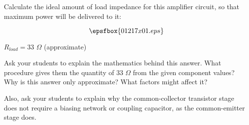 

Calculate the ideal amount of load impedance for this amplifier circuit, so that maximum power will be delivered to it:

$$\epsfbox{01217x01.eps}$$







$R_{load} = 33$ $\Omega$ (approximate)







Ask your students to explain the mathematics behind this answer.  What procedure gives them the quantity of 33 $\Omega$ from the given component values?  Why is this answer only approximate?  What factors might affect it?

Also, ask your students to explain why the common-collector transistor stage does not require a biasing network or coupling capacitor, as the common-emitter stage does.




